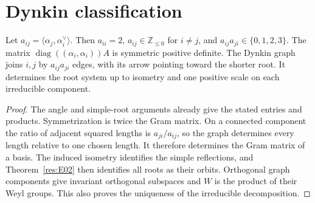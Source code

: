 \section{Dynkin classification}

\begin{proposition}\label{res:E04}
Let \(a_{ij}=\langle\alpha_j,\alpha_i^\vee\rangle\).
Then \(a_{ii}=2\), \(a_{ij}\in\mathbb Z_{\le0}\) for
\(i\ne j\), and \(a_{ij}a_{ji}\in\{0,1,2,3\}\).
The matrix \(\operatorname{diag}((\alpha_i,\alpha_i))A\)
is symmetric positive definite. The Dynkin graph joins \(i,j\)
by \(a_{ij}a_{ji}\) edges, with its arrow pointing toward
the shorter root. It determines the root system up to
isometry and one positive scale on each irreducible component.
\end{proposition}
\begin{proof}
The angle and simple-root arguments already give the stated
entries and products. Symmetrization is twice the Gram matrix.
On a connected component the ratio of adjacent squared lengths
is \(a_{ji}/a_{ij}\), so the graph determines every length
relative to one chosen length. It therefore determines the
Gram matrix of a basis. The induced isometry identifies
the simple reflections, and Theorem~\ref{res:E02} then
identifies all roots as their orbits.
Orthogonal graph components give invariant orthogonal
subspaces and \(W\) is the product of their Weyl groups.
This also proves the uniqueness of the irreducible decomposition.
\end{proof}

